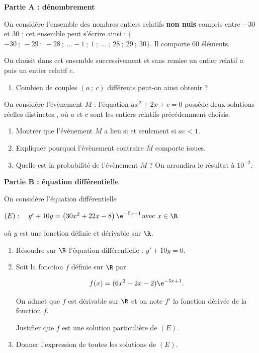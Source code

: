 \medskip

\textbf{Partie A : dénombrement}

On considère l'ensemble des nombres entiers relatifs \textbf{non nuls} compris entre $- 30$ et $30$ ; cet ensemble peut s'écrire ainsi : \{$- 30~;~- 29~;~- 28~;~ ... - 1~;~1~;~ ... ~;~ 28~;~29~;~30$\}. Il comporte 60 éléments.

On choisit dans cet ensemble successivement et sans remise un entier relatif $a$ puis un entier relatif $c$.

\medskip

\begin{enumerate}
\item Combien de couples $(a~;~ c)$ différents peut-on ainsi obtenir ?
\end{enumerate}

On considère l'évènement $M$ : \og l'équation $ax^2 + 2x + c = 0$ possède deux solutions réelles distinctes \fg, où $a$ et $c$ sont les entiers relatifs précédemment choisis.

\begin{enumerate}[resume]
\item Montrer que l'évènement $M$ a lieu si et seulement si $ac < 1$.
\item Expliquer pourquoi l'évènement contraire $\overline{M}$ comporte  issues.
\item Quelle est la probabilité de l'évènement $M$ ? On arrondira le résultat à $10^{-2}$.
\end{enumerate}

\medskip

\textbf{Partie B : équation différentielle}

\medskip

On considère l'équation différentielle 

\begin{center}$(E) :\quad  y' + 10y = \left(30x^2 + 22x - 8\right)\e^{-5x+1}$\quad avec \quad $x \in \R$\end{center}

où $y$ est une fonction définie et dérivable sur $\R$.

\medskip

\begin{enumerate}
\item Résoudre sur $\R$ l'équation différentielle : $y' + 10y = 0$.
\item Soit la fonction $f$ définie sur $\R$ par 

\[f(x) = (6x^2 + 2x - 2)\e^{-5x+ 1}.\]

On admet que $f$ est dérivable sur $\R$ et on note $f'$ la fonction dérivée de la fonction $f$.

Justifier que $f$ est une solution particulière de $(E)$.
\item Donner l'expression de toutes les solutions de $(E)$.
\end{enumerate}

